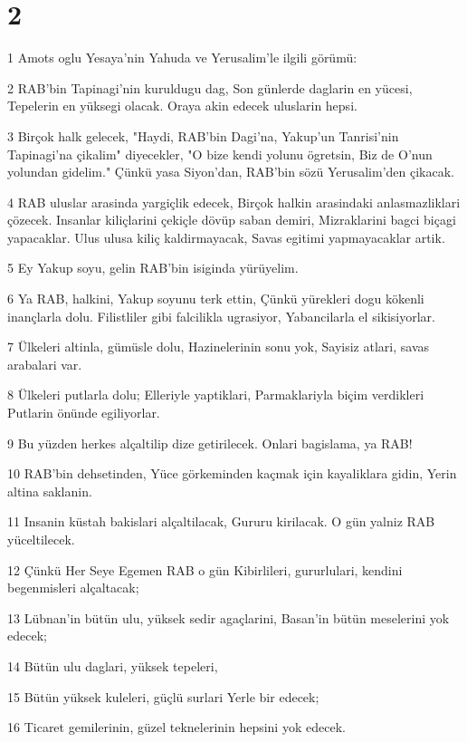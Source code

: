 \chapter{2}

\par 1 Amots oglu Yesaya'nin Yahuda ve Yerusalim'le ilgili görümü:
\par 2 RAB'bin Tapinagi'nin kuruldugu dag, Son günlerde daglarin en yücesi, Tepelerin en yüksegi olacak. Oraya akin edecek uluslarin hepsi.
\par 3 Birçok halk gelecek, "Haydi, RAB'bin Dagi'na, Yakup'un Tanrisi'nin Tapinagi'na çikalim" diyecekler, "O bize kendi yolunu ögretsin, Biz de O'nun yolundan gidelim." Çünkü yasa Siyon'dan, RAB'bin sözü Yerusalim'den çikacak.
\par 4 RAB uluslar arasinda yargiçlik edecek, Birçok halkin arasindaki anlasmazliklari çözecek. Insanlar kiliçlarini çekiçle dövüp saban demiri, Mizraklarini bagci biçagi yapacaklar. Ulus ulusa kiliç kaldirmayacak, Savas egitimi yapmayacaklar artik.
\par 5 Ey Yakup soyu, gelin RAB'bin isiginda yürüyelim.
\par 6 Ya RAB, halkini, Yakup soyunu terk ettin, Çünkü yürekleri dogu kökenli inançlarla dolu. Filistliler gibi falcilikla ugrasiyor, Yabancilarla el sikisiyorlar.
\par 7 Ülkeleri altinla, gümüsle dolu, Hazinelerinin sonu yok, Sayisiz atlari, savas arabalari var.
\par 8 Ülkeleri putlarla dolu; Elleriyle yaptiklari, Parmaklariyla biçim verdikleri Putlarin önünde egiliyorlar.
\par 9 Bu yüzden herkes alçaltilip dize getirilecek. Onlari bagislama, ya RAB!
\par 10 RAB'bin dehsetinden, Yüce görkeminden kaçmak için kayaliklara gidin, Yerin altina saklanin.
\par 11 Insanin küstah bakislari alçaltilacak, Gururu kirilacak. O gün yalniz RAB yüceltilecek.
\par 12 Çünkü Her Seye Egemen RAB o gün Kibirlileri, gururlulari, kendini begenmisleri alçaltacak;
\par 13 Lübnan'in bütün ulu, yüksek sedir agaçlarini, Basan'in bütün meselerini yok edecek;
\par 14 Bütün ulu daglari, yüksek tepeleri,
\par 15 Bütün yüksek kuleleri, güçlü surlari Yerle bir edecek;
\par 16 Ticaret gemilerinin, güzel teknelerinin hepsini yok edecek.

